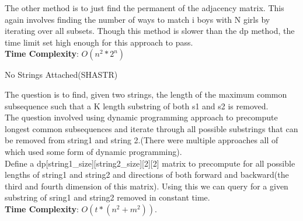 \documentclass[solution,addpoints,12pt]{exam}
\begin{document}
\begin{questions}
\begin{solution}
	The other method is to just find the permanent of the adjacency matrix. This again involves finding the number of ways to match i boys with N girls by iterating over all subsets. Though this method is slower than the dp method, the time limit set high enough for this approach to pass. \\
	
	\textbf{Time Complexity}: $O(n^2 \ast 2^n)$\\
	
\end{solution}

\question
  No Strings Attached(SHASTR)
  
  \begin{solution}
    The question is to find, given two strings, the length of the maximum common subsequence such that a K length substring of both s1 and s2 is removed. \\
    
    The question involved using dynamic programming approach to precompute longest common subsequences and iterate through all possible substrings
    that can be removed from string1 and string 2.(There were multiple approaches all of which used some form of dynamic programming). \\
    
    Define a dp[string1\_size][string2\_size][2][2] matrix to precompute for all possible lengths of string1 and string2 and directions of both forward 
    and backward(the third and fourth dimension of this matrix). Using this we can query for a given substring of sring1 and string2 removed in
    constant time. \\
    
    \textbf{Time Complexity}: $O(t \ast (n^2 + m^2))$. \\
  
  \end{solution}

\end{questions}
\end{document}
